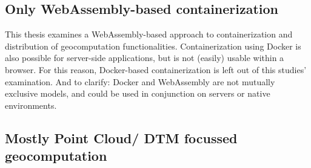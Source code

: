 








\subsection*{Only WebAssembly-based containerization}

This thesis examines a WebAssembly-based approach to containerization and distribution of geocomputation functionalities. 
Containerization using Docker is also possible for server-side applications, but is not (easily) usable within a browser. 
For this reason, Docker-based containerization is left out of this studies' examination. 
And to clarify: Docker and WebAssembly are not mutually exclusive models, and could be used in conjunction on servers or native environments. 

\subsection*{Mostly Point Cloud/ DTM focussed geocomputation}

